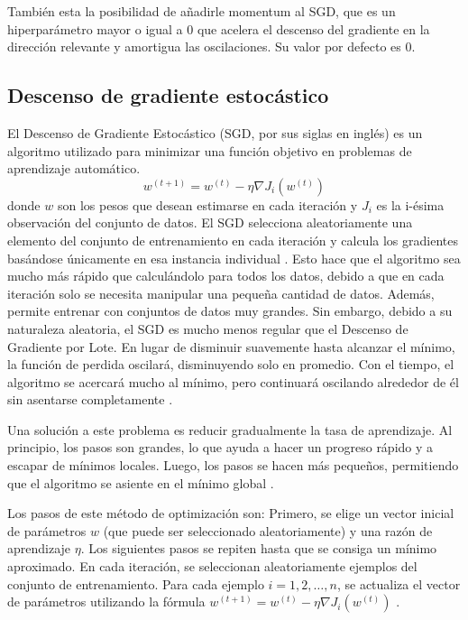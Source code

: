 También esta la posibilidad de añadirle momentum al SGD, que es un hiperparámetro mayor o igual a 0 que acelera el descenso del gradiente en la dirección relevante y amortigua las oscilaciones. Su valor por defecto es 0. 

\subsection{Descenso de gradiente estocástico}


El Descenso de Gradiente Estocástico (SGD, por sus siglas en inglés) es un algoritmo utilizado para minimizar una función objetivo en problemas de aprendizaje automático. 
\[
w^{(t+1)} = w^{(t)} - \eta \nabla J_i (w^{(t)})
\]
donde $w$ son los pesos que desean estimarse en cada iteración y $J_i$ es la i-ésima observación del conjunto de datos. El SGD selecciona aleatoriamente una elemento del conjunto de entrenamiento en cada iteración y calcula los gradientes basándose únicamente en esa instancia individual \citep{pajares2021aprendizaje}. Esto hace que el algoritmo sea mucho más rápido que calculándolo para todos los datos, debido a que en cada iteración solo se necesita manipular una pequeña cantidad de datos. Además, permite entrenar con conjuntos de datos muy grandes. Sin embargo, debido a su naturaleza aleatoria, el SGD es mucho menos regular que el Descenso de Gradiente por Lote. En lugar de disminuir suavemente hasta alcanzar el mínimo, la función de perdida oscilará, disminuyendo solo en promedio. Con el tiempo, el algoritmo se acercará mucho al mínimo, pero continuará oscilando alrededor de él sin asentarse completamente \citep{geron2022hands}.

Una solución a este problema es reducir gradualmente la tasa de aprendizaje. Al principio, los pasos son grandes, lo que ayuda a hacer un progreso rápido y a escapar de mínimos locales. Luego, los pasos se hacen más pequeños, permitiendo que el algoritmo se asiente en el mínimo global \citep{geron2022hands}.


Los pasos de este método de optimización son: Primero, se elige un vector inicial de parámetros \( w \) (que puede ser seleccionado aleatoriamente) y una razón de aprendizaje \( \eta \). Los siguientes pasos se repiten hasta que se consiga un mínimo aproximado. En cada iteración, se seleccionan aleatoriamente ejemplos del conjunto de entrenamiento. Para cada ejemplo \( i = 1, 2, \ldots, n \), se actualiza el vector de parámetros utilizando la fórmula \( w^{(t+1)} = w^{(t)} - \eta \nabla J_i (w^{(t)}) \) \citep{pajares2021aprendizaje}.


